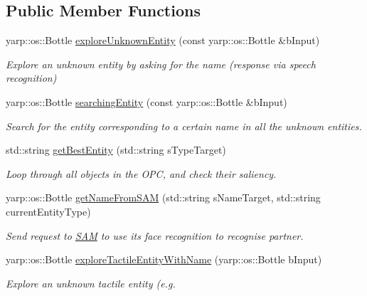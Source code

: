 \subsection*{Public Member Functions}
\begin{DoxyCompactItemize}
\item 
yarp\+::os\+::\+Bottle \hyperlink{classproactiveTagging_a7645a181289f171fc5268ecd24e7ace9}{explore\+Unknown\+Entity} (const yarp\+::os\+::\+Bottle \&b\+Input)
\begin{DoxyCompactList}\small\item\em Explore an unknown entity by asking for the name (response via speech recognition) \end{DoxyCompactList}\item 
yarp\+::os\+::\+Bottle \hyperlink{classproactiveTagging_a06f3da8e08290cc4e667dc1f1ab0a2ba}{searching\+Entity} (const yarp\+::os\+::\+Bottle \&b\+Input)
\begin{DoxyCompactList}\small\item\em Search for the entity corresponding to a certain name in all the unknown entities. \end{DoxyCompactList}\item 
std\+::string \hyperlink{classproactiveTagging_a203d678d3eb79a1fe78d9f2142e0459e}{get\+Best\+Entity} (std\+::string s\+Type\+Target)
\begin{DoxyCompactList}\small\item\em Loop through all objects in the O\+PC, and check their saliency. \end{DoxyCompactList}\item 
yarp\+::os\+::\+Bottle \hyperlink{classproactiveTagging_a7d77039a8eb90ea145043d28a2b5435c}{get\+Name\+From\+S\+AM} (std\+::string s\+Name\+Target, std\+::string current\+Entity\+Type)
\begin{DoxyCompactList}\small\item\em Send request to \hyperlink{namespaceSAM}{S\+AM} to use its face recognition to recognise partner. \end{DoxyCompactList}\item 
yarp\+::os\+::\+Bottle \hyperlink{classproactiveTagging_ad767fe5d8389c2773da1d34501b8b792}{explore\+Tactile\+Entity\+With\+Name} (yarp\+::os\+::\+Bottle b\+Input)
\begin{DoxyCompactList}\small\item\em Explore an unknown tactile entity (e.\+g. \end{DoxyCompactList}\item 

\end{DoxyCompactItemize}
